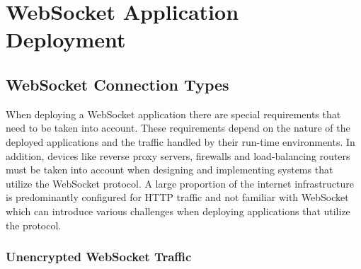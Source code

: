 \chapter{WebSocket Application Deployment}
\label{chapter:webSocketApplicationDeployment}

\section{WebSocket Connection Types}

When deploying a WebSocket application there are special requirements that need to be taken into account. These requirements depend on the nature of the deployed applications and the traffic handled by their run-time environments. In addition, devices like reverse proxy servers, firewalls and load-balancing routers must be taken into account when designing and implementing systems that utilize the WebSocket protocol. A large proportion of the internet infrastructure is predominantly configured for HTTP traffic and not familiar with WebSocket which can introduce various challenges when deploying applications that utilize the protocol.

\subsection{Unencrypted WebSocket Traffic}

